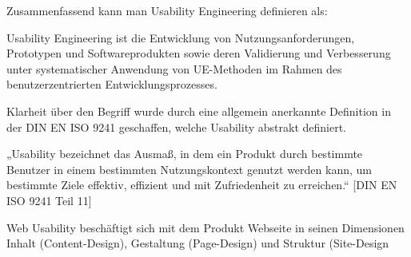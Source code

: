 \documentclass[a4paper, 12pt, twoside, BCOR=20mm, DIV=calc, abstracton, parskip=half*, toc=bibliography, toc=listof, headsepline, footsepline, headings=small, numbers=enddot]{scrreprt}
\begin{document}
 Zusammenfassend kann man Usability Engineering definieren als:

Usability Engineering ist die Entwicklung von Nutzungsanforderungen, Prototypen und Softwareprodukten sowie deren Validierung und Verbesserung unter systematischer Anwendung von UE-Methoden im Rahmen des benutzerzentrierten Entwicklungsprozesses.



Klarheit über den Begriff wurde durch eine allgemein anerkannte Definition in der DIN EN ISO 9241 geschaffen, welche Usability abstrakt definiert.

„Usability bezeichnet das Ausmaß, in dem ein Produkt durch bestimmte Benutzer in einem bestimmten Nutzungskontext genutzt werden kann, um bestimmte Ziele effektiv, effizient und mit Zufriedenheit zu erreichen.“ [DIN EN ISO 9241 Teil 11]

Web Usability beschäftigt sich mit dem Produkt Webseite in seinen Dimensionen Inhalt (Content-Design), Gestaltung (Page-Design) und Struktur (Site-Design		
\end{document}
